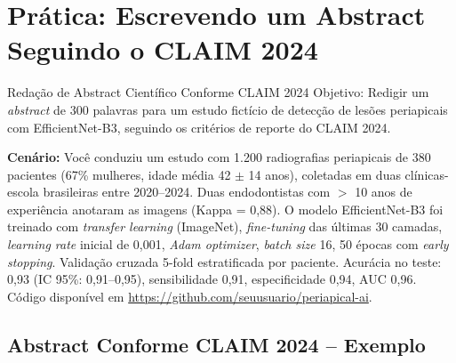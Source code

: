 \section{Prática: Escrevendo um Abstract Seguindo o CLAIM 2024}
\label{sec:pratica-abstract}

\nivelcinco

\begin{pratica}{Redação de Abstract Científico Conforme CLAIM 2024}
  Objetivo: Redigir um \textit{abstract} de 300 palavras para um estudo
  fictício de detecção de lesões periapicais com EfficientNet-B3, seguindo os
  critérios de reporte do CLAIM 2024.

  \textbf{Cenário:} Você conduziu um estudo com 1.200 radiografias periapicais
  de 380 pacientes (67\% mulheres, idade média 42 $\pm$ 14 anos), coletadas em
  duas clínicas-escola brasileiras entre 2020--2024. Duas endodontistas com $>$
  10 anos de experiência anotaram as imagens (Kappa = 0,88). O modelo
  EfficientNet-B3 foi treinado com \textit{transfer learning} (ImageNet),
  \textit{fine-tuning} das últimas 30 camadas, \textit{learning rate} inicial
  de 0,001, \textit{Adam optimizer}, \textit{batch size} 16, 50 épocas com
  \textit{early stopping}. Validação cruzada 5-fold estratificada por paciente.
  Acurácia no teste: 0,93 (IC 95\%: 0,91--0,95), sensibilidade 0,91,
  especificidade 0,94, AUC 0,96. Código disponível em
  \url{https://github.com/seuusuario/periapical-ai}.
\end{pratica}

\subsection{Abstract Conforme CLAIM 2024 -- Exemplo}

